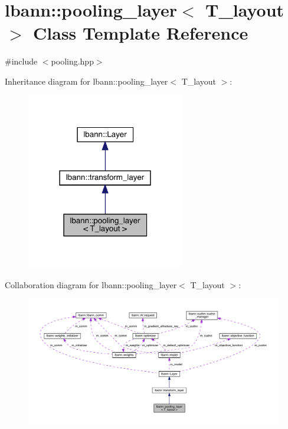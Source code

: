 \hypertarget{classlbann_1_1pooling__layer}{}\section{lbann\+:\+:pooling\+\_\+layer$<$ T\+\_\+layout $>$ Class Template Reference}
\label{classlbann_1_1pooling__layer}


{\ttfamily \#include $<$pooling.\+hpp$>$}



Inheritance diagram for lbann\+:\+:pooling\+\_\+layer$<$ T\+\_\+layout $>$\+:\nopagebreak
\begin{figure}[H]
\begin{center}
\leavevmode
\includegraphics[width=195pt]{classlbann_1_1pooling__layer__inherit__graph}
\end{center}
\end{figure}


Collaboration diagram for lbann\+:\+:pooling\+\_\+layer$<$ T\+\_\+layout $>$\+:\nopagebreak
\begin{figure}[H]
\begin{center}
\leavevmode
\includegraphics[width=350pt]{classlbann_1_1pooling__layer__coll__graph}
\end{center}
\end{figure}
